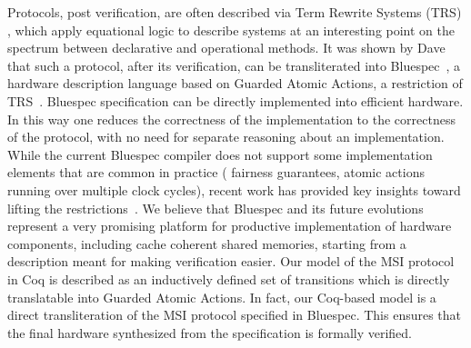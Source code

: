 Protocols, post verification, are often described via Term Rewrite Systems
(TRS) , which apply equational logic to describe
systems at an interesting point on the spectrum between declarative and
operational methods.  It was shown by Dave
\etal{}~\cite{DNA:CoherenceImplementation} that such a protocol, after its
verification, can be transliterated into Bluespec~\cite{Bluespec:TFRG}, a
hardware description language based on Guarded Atomic Actions, a restriction of
TRS~\cite{Hoe:TCAD}. Bluespec specification can be directly implemented into
efficient hardware. In this way one reduces the correctness of the
implementation to the correctness of the protocol, with no need for separate
reasoning about an implementation. While the current Bluespec compiler does not
support some implementation elements that are common in practice (\eg{}
fairness guarantees, atomic actions running over multiple clock cycles), recent
work has provided key insights toward lifting the
restrictions~\cite{Karczmarek}. We believe that Bluespec and its future
evolutions represent a very promising platform for productive implementation of
hardware components, including cache coherent shared memories, starting from a
description meant for making verification easier. Our model of the MSI protocol
in Coq is described as an inductively defined set of transitions which is
directly translatable into Guarded Atomic Actions. In fact, our Coq-based model
is a direct transliteration of the MSI protocol specified in Bluespec.  This
ensures that the final hardware synthesized from the specification is formally
verified.

%

